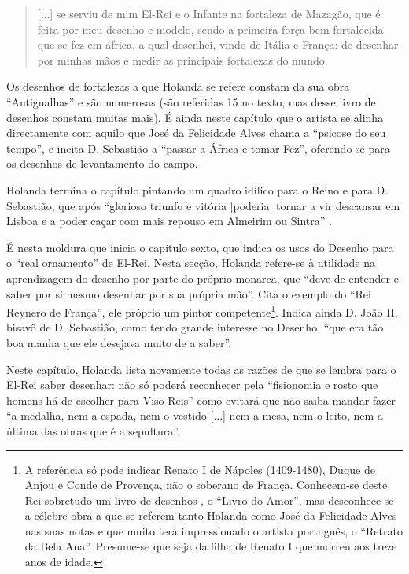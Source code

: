 \documentclass{article}
\begin{document}
\begin{quote}
  [...] se serviu de mim El-Rei e o Infante na fortaleza de Mazagão,
  que é feita por meu desenho e modelo, sendo a primeira força bem
  fortalecida que se fez em áfrica, a qual desenhei, vindo de Itália e
  França: de desenhar por minhas mãos e medir as principais fortalezas
  do mundo.
\end{quote}

Os desenhos de fortalezas a que Holanda se refere constam da sua obra
``Antigualhas'' e são numerosas (são referidas 15 no texto, mas desse
livro de desenhos constam muitas mais). É ainda neste capítulo que o
artista se alinha directamente com aquilo que José da Felicidade Alves
chama a ``psicose do seu tempo''\cite[notas,p.54]{holanda}, e incita
D. Sebastião a ``passar a África e tomar Fez'', oferendo-se para os
desenhos de levantamento do campo.

Holanda termina o capítulo pintando um quadro idílico para o Reino e
para D. Sebastião, que após ``glorioso triunfo e vitória [poderia]
tornar a vir descansar em Lisboa e a poder caçar com mais repouso em
Almeirim ou Sintra'' \cite[fl.45v]{holanda}.

É nesta moldura que inicia o capítulo sexto, que indica os usos do
Desenho para o ``real ornamento'' de El-Rei. Nesta secção, Holanda
refere-se à utilidade na aprendizagem do desenho por parte do próprio
monarca, que ``deve de entender e saber por si mesmo desenhar por sua
própria mão''. Cita o exemplo do ``Rei Reynero de França'', ele
próprio um pintor competente\footnote{A referência só pode indicar
  Renato I de Nápoles (1409-1480), Duque de Anjou e Conde de Provença,
  não o soberano de França. Conhecem-se deste Rei sobretudo um livro
  de desenhos , o ``Livro do Amor'', mas desconhece-se a célebre obra
  a que se referem tanto Holanda como José da Felicidade Alves nas
  suas notas e que muito terá impressionado o artista português, o
  ``Retrato da Bela Ana''. Presume-se que seja da filha de Renato I
  que morreu aos treze anos de idade.}. Indica ainda D. João II,
bisavô de D. Sebastião, como tendo grande interesse no Desenho, ``que
era tão boa manha que ele desejava muito de a saber''.

Neste capítulo, Holanda lista novamente todas as razões de que se
lembra para o El-Rei saber desenhar: não só poderá reconhecer pela
``fisionomia e rosto que homens há-de escolher para Viso-Reis'' como
evitará que não saiba mandar fazer ``a medalha, nem a espada, nem o
vestido [...] nem a mesa, nem o leito, nem a última das obras que é a
sepultura''.
\end{document}
